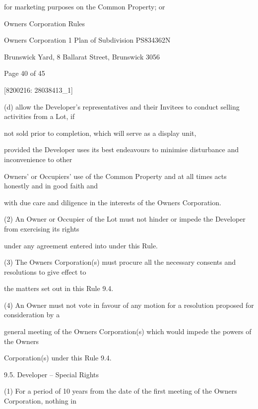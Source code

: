 \documentclass{article}
\begin{document}
{\fontsize{10.02}{1}for marketing purposes on the Common Property; or }

\newpage





{\fontsize{9}{1}Owners Corporation Rules }

{\fontsize{9}{1}Owners Corporation 1 Plan of Subdivision PS834362N }

{\fontsize{9}{1}Brunswick Yard, 8 Ballarat Street, Brunswick 3056 }


{\fontsize{9}{1}Page 40  of 45 }



{\fontsize{7.02}{1}[8200216: 28038413\_1] }

{\fontsize{9.962}{1}(d) allow the Developer's representatives and their Invitees to conduct selling activities from a Lot, if }

{\fontsize{10.02}{1}not sold prior to completion, which will serve as a display unit, }

{\fontsize{10.02}{1}provided the Developer uses its best endeavours to minimise disturbance and inconvenience to other }

{\fontsize{10.02}{1}Owners' or Occupiers' use of the Common Property and at all times acts honestly and in good faith and }

{\fontsize{10.02}{1}with due care and diligence in the interests of the Owners Corporation. }

{\fontsize{9.962}{1}(2) An Owner or Occupier of the Lot must not hinder or impede the Developer from exercising its rights }

{\fontsize{10.02}{1}under any agreement entered into under this Rule. }

{\fontsize{9.962}{1}(3) The Owners Corporation(s) must procure all the necessary consents and resolutions to give effect to }

{\fontsize{10.02}{1}the matters set out in this Rule 9.4. }

{\fontsize{9.962}{1}(4) An Owner must not vote in favour of any motion for a resolution proposed for consideration by a }

{\fontsize{10.02}{1}general meeting of the Owners Corporation(s) which would impede the powers of the Owners }

{\fontsize{10.02}{1}Corporation(s) under this Rule 9.4. }

{\fontsize{9.99}{1}9.5. Developer – Special Rights }

{\fontsize{9.962}{1}(1) For a period of 10 years from the date of the first meeting of the Owners Corporation, nothing in }
\end{document}
